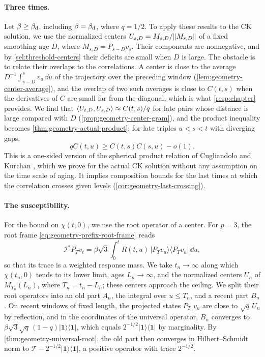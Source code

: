 \paragraph{Three times.}
Let $\beta\ge\beta_{\mathrm d}$, including $\beta=\beta_{\mathrm d}$, where $q=1/2$. To apply these results to the CK solution, we use the normalized centers $U_{s,D}=M_{s,D}/\lVert M_{s,D}\rVert$ of a fixed smoothing age $D$, where $M_{s,D}=P_{s-D}v_s$. Their components are nonnegative, and by \cref{sel:threshold-centers} their deficits are small when $D$ is large. The obstacle is to relate their overlaps to the correlations. A center is close to the average $D^{-1}\int_{s-D}^sv_u\,\dd u$ of the trajectory over the preceding window (\cref{lem:geometry-center-average}), and the overlap of two such averages is close to $C(t,s)$ when the derivatives of $C$ are small far from the diagonal, which is what \cref{resp:chapter} provides. We find that $\left\langle U_{t,D},U_{s,D}\right\rangle\approx C(t,s)/q$ for late pairs whose distance is large compared with $D$ (\cref{prop:geometry-center-gram}), and the product inequality becomes \cref{thm:geometry-actual-product}: for late triples $u<s<t$ with diverging gaps,
\[
 qC(t,u)\ge C(t,s)C(s,u)-o(1).
\]
This is a one-sided version of the spherical product relation of Cugliandolo and Kurchan \cite[arXiv version~1, Section~5.1, Equation~(5.1.8)]{ck1994}, which we prove for the actual CK solution without any assumption on the time scale of aging. It implies composition bounds for the last times at which the correlation crosses given levels (\cref{cor:geometry-last-crossing}).

\paragraph{The susceptibility.}
For the bound on $\chi(t,0)$, we use the root operator of a center. For $p=3$, the root frame \eqref{eq:geometry-prefix-root-frame} reads
\[
 \mathcal I^*P_Tv_t=\beta\sqrt3\int_0^tR(t,u)\,|P_Tv_u\rangle\langle P_Tv_u|\,\dd u,
\]
so that its trace is a weighted response mass. We take $t_n\to\infty$ along which $\chi(t_n,0)$ tends to its lower limit, ages $L_n\to\infty$, and the normalized centers $U_n$ of $M_{T_n}(L_n)$, where $T_n=t_n-L_n$; these centers approach the ceiling. We split their root operators into an old part $A_n$, the integral over $u\le T_n$, and a recent part $B_n$. On recent windows of fixed length, the projected states $P_{T_n}v_u$ are close to $\sqrt q\,U_n$ by reflection, and in the coordinates of the universal operator, $B_n$ converges to $\beta\sqrt3\sqrt q\,(1-q)|\mathbf1\rangle\langle\mathbf1|$, which equals $2^{-1/2}|\mathbf1\rangle\langle\mathbf1|$ by marginality. By \cref{thm:geometry-universal-root}, the old part then converges in Hilbert--Schmidt norm to $\mathcal T-2^{-1/2}|\mathbf1\rangle\langle\mathbf1|$, a positive operator with trace $2^{-1/2}$.

